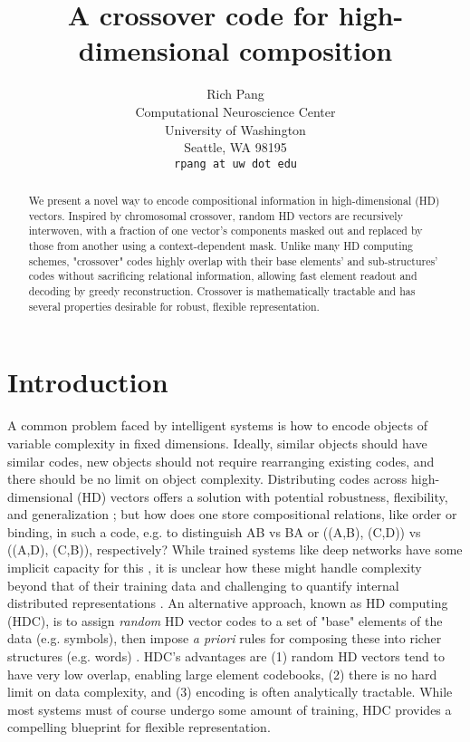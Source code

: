 \documentclass{article}
\title{A crossover code for high-dimensional composition}
\author{%
  Rich Pang\\
  Computational Neuroscience Center\\
  University of Washington\\
  Seattle, WA 98195\\
  \texttt{rpang at uw dot edu} \\
}
\begin{document}
\maketitle

\begin{abstract}
We present a novel way to encode compositional information in high-dimensional (HD) vectors. Inspired by chromosomal crossover, random HD vectors are recursively interwoven, with a fraction of one vector's components masked out and replaced by those from another using a context-dependent mask. Unlike many HD computing schemes, "crossover" codes highly overlap with their base elements' and sub-structures' codes without sacrificing relational information, allowing fast element readout and decoding by greedy reconstruction. Crossover is mathematically tractable and has several properties desirable for robust, flexible representation.
\end{abstract}

\section{Introduction}

A common problem faced by intelligent systems is how to encode objects of variable complexity in fixed dimensions. Ideally, similar objects should have similar codes, new objects should not require rearranging existing codes, and there should be no limit on object complexity. Distributing codes across high-dimensional (HD) vectors offers a solution with potential robustness, flexibility, and generalization \cite{Hinton:1984, Mikolov:2013}; but how does one store compositional relations, like order or binding, in such a code, e.g. to distinguish AB vs BA or ((A,B), (C,D)) vs ((A,D), (C,B)), respectively? While trained systems like deep networks have some implicit capacity for this \cite{Bahdanau:2014, Luong:2015, Wu:2016}, it is unclear how these might handle complexity beyond that of their training data and challenging to quantify internal distributed representations \cite{Lipton:2016}. An alternative approach, known as HD computing (HDC), is to assign \textit{random} HD vector codes to a set of "base" elements of the data (e.g. symbols), then impose \textit{a priori} rules for composing these into richer structures (e.g. words) \cite{Plate:1995, Kanerva:2009, Gayler:2004}. HDC's advantages are (1) random HD vectors tend to have very low overlap, enabling large element codebooks, (2) there is no hard limit on data complexity, and (3) encoding is often analytically tractable. While most systems must of course undergo some amount of training, HDC provides a compelling blueprint for flexible representation.
\end{document}
